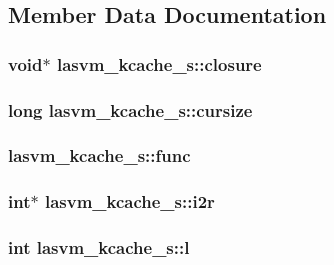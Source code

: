 \subsection{Member Data Documentation}
\hypertarget{structlasvm__kcache__s_a4516c91ba6dd7799504249943ff9cbf8}{
\subsubsection[{closure}]{\setlength{\rightskip}{0pt plus 5cm}void$\ast$ lasvm\+\_\+kcache\+\_\+s\+::closure}}\label{structlasvm__kcache__s_a4516c91ba6dd7799504249943ff9cbf8}
\hypertarget{structlasvm__kcache__s_a84940d998a6b827f729a6fafa8ae59b1}{
\subsubsection[{cursize}]{\setlength{\rightskip}{0pt plus 5cm}long lasvm\+\_\+kcache\+\_\+s\+::cursize}}\label{structlasvm__kcache__s_a84940d998a6b827f729a6fafa8ae59b1}
\hypertarget{structlasvm__kcache__s_a7e5e8547ce3165e68060e3ce0d150436}{
\subsubsection[{func}]{ lasvm\+\_\+kcache\+\_\+s\+::func}}\label{structlasvm__kcache__s_a7e5e8547ce3165e68060e3ce0d150436}
\hypertarget{structlasvm__kcache__s_af4e1cdc8a78c26af9cf0f2db0b2c6ac0}{
\subsubsection[{i2r}]{\setlength{\rightskip}{0pt plus 5cm}int$\ast$ lasvm\+\_\+kcache\+\_\+s\+::i2r}}\label{structlasvm__kcache__s_af4e1cdc8a78c26af9cf0f2db0b2c6ac0}
\hypertarget{structlasvm__kcache__s_a4bf7b51eda770a56e9a5b1d263582d20}{
\subsubsection[{l}]{\setlength{\rightskip}{0pt plus 5cm}int lasvm\+\_\+kcache\+\_\+s\+::l}}\label{structlasvm__kcache__s_a4bf7b51eda770a56e9a5b1d263582d20}
